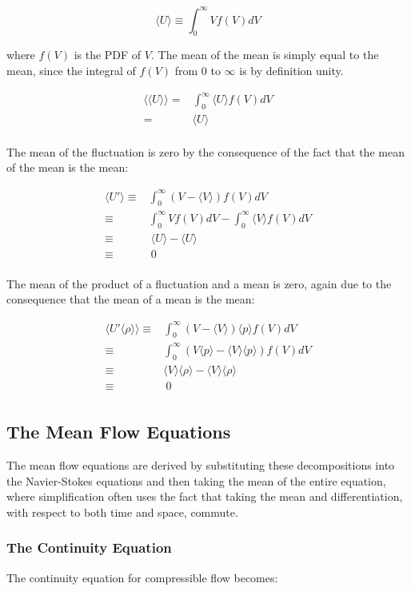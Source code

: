 \documentclass[10pt]{article}
\newcommand{\beq}{\begin{equation}}
\newcommand{\eeq}{\end{equation}}
\newcommand{\beqa}{\begin{equation}\begin{aligned}}
\newcommand{\eeqa}{\end{aligned}\end{equation}}
\newcommand{\la}{\langle}
\newcommand{\ra}{\rangle}
\begin{document}
\begin{flushleft}
\begin{tcolorbox}[breakable]
\beq
\la U\ra\equiv\int_{0}^{\infty}Vf(V)dV
\eeq

where \(f(V)\) is the PDF of \(V\). The mean of the mean is simply equal to the mean, since the integral of \(f(V)\) from 0 to \(\infty\) is by definition unity. 

\beqa
\la\la U\ra\ra=&\int_{0}^{\infty}\la U\ra f(V)dV\\
=&\la U\ra\\
\eeqa

The mean of the fluctuation is zero by the consequence of the fact that the mean of the mean is the mean:

\beqa
\la U'\ra\equiv&\int_{0}^{\infty}(V-\la V\ra)f(V)dV\\
\equiv& \int_{0}^{\infty}Vf(V)dV - \int_{0}^{\infty}\la V\ra f(V)dV\\
\equiv&\ \la U\ra - \la U\ra\\
\equiv&\ 0\\
\eeqa

The mean of the product of a fluctuation and a mean is zero, again due to the consequence that the mean of a mean is the mean:

\beqa
\la U'\la\rho\ra\ra\equiv&\int_{0}^{\infty}(V-\la V\ra)\la p\ra f(V)dV\\
\equiv&\int_{0}^{\infty}\left(V\la p\ra-\la V\ra\la p\ra\right)f(V)dV\\
\equiv&\la V\ra\la\rho\ra-\la V\ra\la\rho\ra\\
\equiv&\ 0\\
\eeqa

\end{tcolorbox}




\subsection{The Mean Flow Equations}

The mean flow equations are derived by substituting these decompositions into the Navier-Stokes equations and then taking the mean of the entire equation, where simplification often uses the fact that taking the mean and differentiation, with respect to both time and space, commute. 


\subsubsection{The Continuity Equation}
The continuity equation for compressible flow becomes:


\end{flushleft}
\end{document}
